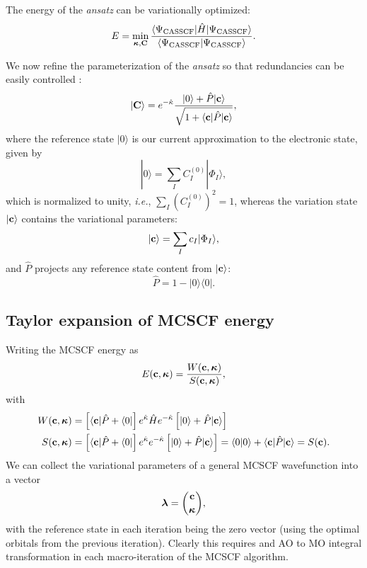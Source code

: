 \documentclass{article}
\begin{document}
The energy of the \textit{ansatz} can be variationally optimized:
\begin{equation}
E=\min_{\bm{\mathrm{\kappa}},\bm{\mathrm{C}}}\frac{\langle \Psi_{\mathrm{CASSCF}}|\hat{H}|\Psi_{\mathrm{CASSCF}}\rangle}{\langle \Psi_{\mathrm{CASSCF}}|\Psi_{\mathrm{CASSCF}}\rangle}.
\end{equation}

We now refine the parameterization of the \textit{ansatz} so that redundancies can be easily controlled \cite[Ch. 11.4.1]{helgakerMolecularElectronicStructure2000}:
\begin{equation}
|\bm{\mathrm{C}}\rangle=e^{-\hat{\kappa}}\frac{|0\rangle + \hat{P}|\bm{\mathrm{c}}\rangle}{\sqrt{1+\langle\bm{\mathrm{c}}|\hat{P}|\bm{\mathrm{c}}\rangle}},
\end{equation}
where the reference state $|0\rangle$ is our current approximation to the electronic state, given by
\begin{equation}
    |0\rangle=\sum_IC_I^{(0)}|\Phi_I\rangle,
\end{equation}
which is normalized to unity, \textit{i.e.}, $\sum_I(C_I^{(0)})^2=1$, whereas the variation state $|\bm{\mathrm{c}}\rangle$ contains the variational parameters:
\begin{equation}
|\bm{\mathrm{c}}\rangle = \sum_Ic_I|\Phi_I\rangle,
\end{equation}
and $\hat{P}$ projects any reference state content from $|\bm{\mathrm{c}}\rangle$:
\begin{equation}
    \hat{P}=1-|0\rangle\langle 0 |.
\end{equation}

\subsection{Taylor expansion of MCSCF energy}
Writing the MCSCF energy as
\begin{equation}
E(\bm{\mathrm{c}},\bm{\mathrm{\kappa}})=\frac{W(\bm{\mathrm{c}},\bm{\mathrm{\kappa}})}{S(\bm{\mathrm{c}},\bm{\mathrm{\kappa}})}, 
\end{equation}
with
\begin{align}
W(\bm{\mathrm{c}},\bm{\mathrm{\kappa}})&=\left[\langle\bm{\mathrm{c}}|\hat{P}+\langle 0| \right]e^{\hat{\kappa}}\hat{H}e^{-\hat{\kappa}}\left[|0\rangle+\hat{P}|\bm{\mathrm{c}}\rangle \right]\\
S(\bm{\mathrm{c}},\bm{\mathrm{\kappa}})&=\left[\langle\bm{\mathrm{c}}|\hat{P}+\langle 0| \right]e^{\hat{\kappa}}e^{-\hat{\kappa}}\left[|0\rangle+\hat{P}|\bm{\mathrm{c}}\rangle \right]=\langle 0|0\rangle+\langle\bm{\mathrm{c}}|\hat{P}|\bm{\mathrm{c}}\rangle=S(\bm{\mathrm{c}}).
\end{align}
We can collect the variational parameters of a general MCSCF wavefunction into a vector
\begin{equation}
\bm{\mathrm{\lambda}}=\binom{\bm{\mathrm{c}}}{\bm{\mathrm{\kappa}}},
\end{equation}
with the reference state in each iteration being the zero vector (using the optimal orbitals from the previous iteration). Clearly this requires and AO to MO integral transformation in each macro-iteration of the MCSCF algorithm.
\end{document}
